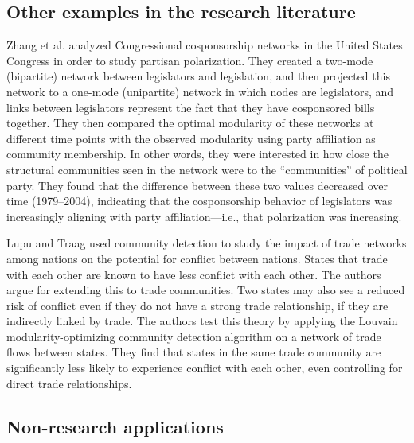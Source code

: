 
\hypertarget{other-research}{\subsection{Other examples in the research
literature}\label{other-research}}

Zhang et al. \autocite{zhang_community_2008} analyzed Congressional
cosponsorship networks in the United States Congress in order to study
partisan polarization. They created a two-mode (bipartite) network
between legislators and legislation, and then projected this network to
a one-mode (unipartite) network in which nodes are legislators, and
links between legislators represent the fact that they have cosponsored
bills together. They then compared the optimal modularity of these
networks at different time points with the observed modularity using
party affiliation as community membership. In other words, they were
interested in how close the structural communities seen in the network
were to the ``communities'' of political party. They found that the
difference between these two values decreased over time (1979--2004),
indicating that the cosponsorship behavior of legislators was
increasingly aligning with party affiliation---i.e., that polarization
was increasing.

Lupu and Traag \autocite{lupu_trading_2013} used community detection to
study the impact of trade networks among nations on the potential for
conflict between nations. States that trade with each other are known to
have less conflict with each other. The authors argue for extending this
to trade communities. Two states may also see a reduced risk of conflict
even if they do not have a strong trade relationship, if they are
indirectly linked by trade. The authors test this theory by applying the
Louvain modularity-optimizing community detection algorithm on a network
of trade flows between states. They find that states in the same trade
community are significantly less likely to experience conflict with each
other, even controlling for direct trade relationships.

\subsection{Non-research applications}\label{non-research-applications}

